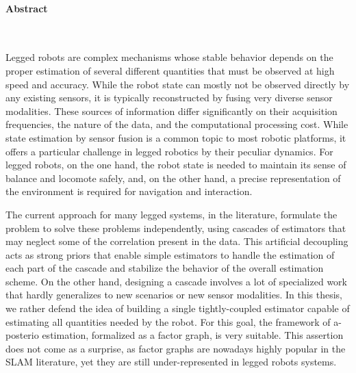 \newpage

\noindent\makebox[\linewidth]{\rule{0.6\textwidth}{2pt}}

\small

\paragraph{Abstract}~

Legged robots are complex mechanisms whose stable behavior depends on the proper estimation of several different quantities that must be observed at high speed and accuracy. While the robot state can mostly not be observed directly by any existing sensors, it is typically reconstructed by fusing very diverse sensor modalities.
These sources of information differ significantly on their acquisition frequencies, the nature of the data, and the computational processing cost. 
While state estimation by sensor fusion is a common topic to most robotic platforms, it offers a particular challenge in legged robotics by their peculiar dynamics.
For legged robots, on the one hand, the robot state is needed to maintain its sense of balance and locomote safely, and, on the other hand, a precise representation of the environment is required for navigation and interaction. 

The current approach for many legged systems, in the literature, formulate the problem to solve
these problems independently, using cascades of estimators that may neglect some of the correlation present in the data.
This artificial decoupling acts as strong priors that enable simple estimators to handle the estimation of each part of the cascade and stabilize the behavior of the overall estimation scheme. On the other hand, designing a cascade involves a lot of specialized work that hardly generalizes to new scenarios or new sensor modalities.
In this thesis, we rather defend the idea of building a single tightly-coupled estimator capable of estimating all quantities needed by the robot. 
For this goal, the framework of a-posterio estimation, formalized as a factor graph, is very suitable. This assertion does not come as a surprise, as factor graphs are nowadays highly popular in the SLAM literature, yet they are still under-represented in legged robots systems.

